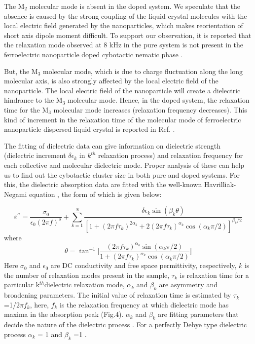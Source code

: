 \documentclass[reprint,amsfonts,amsmath,amssymb,aps,pre,floatfix,10pt]{revtex4-1}
\begin{document}
The M$_{2}$ molecular mode is absent in the doped system. We speculate that the absence is caused by the strong coupling of the liquid crystal molecules with the local electric field generated by the nanoparticles, which makes reorientation of short axis dipole moment difficult. To support our observation, it is reported that the relaxation mode observed at 8 kHz in the pure system is not present in the ferroelectric nanoparticle doped cybotactic nematic phase \cite{derbali2020dielectric_33}.

But, the M$_{3}$ molecular mode, which is due to charge fluctuation along the long molecular axis, is also strongly affected by the local electric field of the nanoparticle. The local electric field of the nanoparticle will create a dielectric hindrance to the M$_{3}$ molecular mode. Hence, in the doped system, the relaxation time for the M$_{3}$ molecular mode increases (relaxation frequency decreases). This kind of increment in the relaxation time of the molecular mode of ferroelectric nanoparticle dispersed liquid crystal is reported in Ref. \cite{ouskova2003dielectric_51}.


The fitting of dielectric data can give information on dielectric strength (dielectric increment $\delta\epsilon_{k}$ in $k^{th}$ relaxation process) and relaxation frequency for each collective and molecular dielectric mode. Proper analysis of these can help us to find out the cybotactic cluster size in both pure and doped systems. For this, the dielectric absorption data are fitted with the well-known Havrilliak-Negami equation \cite{havriliak1966complex_52, havriliak1967complex_53, chakraborty2019induced_54}, the form of which is given below:

{\small
\begin{equation}\label{HN_equation}
\varepsilon^{\prime\prime} = \frac{\sigma_0}{\epsilon_0 (2\pi f)^s} + \sum_{k=1}^{N} \frac{\delta\epsilon_{k}\sin(\beta_{k}\theta)}{[1+(2\pi f\tau_k)^{2\alpha_k}+2(2\pi f\tau_k)^{\alpha_{k}}\cos{(\alpha_{k}\pi/2)}]^{\beta_{k}/2}}
\end{equation}
}
where
\begin{equation}
\label{HN_equation_theta}
\theta = \tan^{-1}\Bigg[\frac{(2\pi f\tau_k)^{\alpha_{k}}\sin{(\alpha_{k}\pi/2)}}{1+(2\pi f\tau_k)^{\alpha_{k}}\cos{(\alpha_{k}\pi/2)}}\Bigg]
\end{equation}
Here $\sigma_0$ and $\epsilon_0$ are DC conductivity and free space permittivity, respectively, $\textit{k}$ is the number of relaxation modes present in the sample, $\tau_k$ is relaxation time for a particular k$^{th}$dielectric relaxation mode, $\alpha_k$ and $\beta_k$ are asymmetry and broadening parameters. The initial value of relaxation time is estimated by $\tau_k$=1/2$\pi$$f_k$, here, \textit{$f_k$} is the relaxation frequency at which dielectric mode has maxima in the absorption peak (Fig.4). $\alpha_k$ and $\beta_k$ are fitting parameters that decide the nature of the dielectric process \cite{haase2013relaxation_43}. For a perfectly Debye type dielectric process $\alpha_k$ = 1 and $\beta_k$ =1 \cite{chakraborty2019induced_54}.
\end{document}
